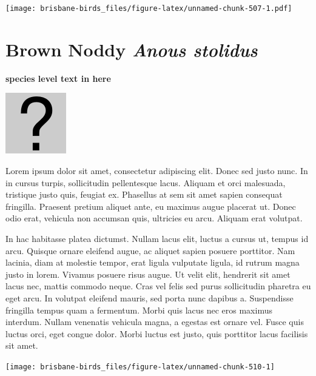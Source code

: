\documentclass[]{book}
\let\origfigure\figure
\let\endorigfigure\endfigure
\renewenvironment{figure}[1][2] {
  \expandafter\origfigure\expandafter[H]
} {
  \endorigfigure
}
\begin{document}
\begin{figure}
\centering
\texttt{[image: brisbane-birds\_files/figure-latex/unnamed-chunk-507-1.pdf]}
\caption{\label{fig:unnamed-chunk-507}insert figure caption}
\end{figure}

\section{\texorpdfstring{Brown Noddy \emph{Anous
stolidus}}{Brown Noddy Anous stolidus}}\label{brown-noddy-anous-stolidus}

\textbf{species level text in here}

\begin{figure}
\centering
\includegraphics{assets/missing.png}
\caption{No image for species}
\end{figure}

Lorem ipsum dolor sit amet, consectetur adipiscing elit. Donec sed justo
nunc. In in cursus turpis, sollicitudin pellentesque lacus. Aliquam et
orci malesuada, tristique justo quis, feugiat ex. Phasellus at sem sit
amet sapien consequat fringilla. Praesent pretium aliquet ante, eu
maximus augue placerat ut. Donec odio erat, vehicula non accumsan quis,
ultricies eu arcu. Aliquam erat volutpat.

In hac habitasse platea dictumst. Nullam lacus elit, luctus a cursus ut,
tempus id arcu. Quisque ornare eleifend augue, ac aliquet sapien posuere
porttitor. Nam lacinia, diam at molestie tempor, erat ligula vulputate
ligula, id rutrum magna justo in lorem. Vivamus posuere risus augue. Ut
velit elit, hendrerit sit amet lacus nec, mattis commodo neque. Cras vel
felis sed purus sollicitudin pharetra eu eget arcu. In volutpat eleifend
mauris, sed porta nunc dapibus a. Suspendisse fringilla tempus quam a
fermentum. Morbi quis lacus nec eros maximus interdum. Nullam venenatis
vehicula magna, a egestas est ornare vel. Fusce quis luctus orci, eget
congue dolor. Morbi luctus est justo, quis porttitor lacus facilisis sit
amet.

\begin{figure}
\texttt{[image: brisbane-birds\_files/figure-latex/unnamed-chunk-510-1]} \caption{insert figure caption}\label{fig:unnamed-chunk-510}
\end{figure}
\end{document}
